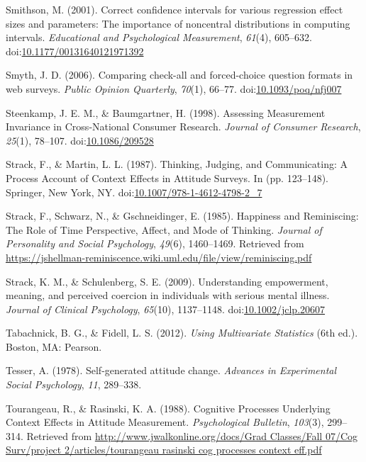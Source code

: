 \documentclass[english,man, mask]{apa6}
\theoremstyle{definition}
\theoremstyle{definition}
\theoremstyle{definition}
\theoremstyle{remark}
\begin{document}
\hypertarget{ref-Smithson2001}{}
Smithson, M. (2001). Correct confidence intervals for various regression
effect sizes and parameters: The importance of noncentral distributions
in computing intervals. \emph{Educational and Psychological
Measurement}, \emph{61}(4), 605--632.
doi:\href{https://doi.org/10.1177/00131640121971392}{10.1177/00131640121971392}

\hypertarget{ref-Smyth2006}{}
Smyth, J. D. (2006). Comparing check-all and forced-choice question
formats in web surveys. \emph{Public Opinion Quarterly}, \emph{70}(1),
66--77.
doi:\href{https://doi.org/10.1093/poq/nfj007}{10.1093/poq/nfj007}

\hypertarget{ref-Steenkamp1998}{}
Steenkamp, J. E. M., \& Baumgartner, H. (1998). Assessing Measurement
Invariance in Cross‐National Consumer Research. \emph{Journal of
Consumer Research}, \emph{25}(1), 78--107.
doi:\href{https://doi.org/10.1086/209528}{10.1086/209528}

\hypertarget{ref-Strack1987}{}
Strack, F., \& Martin, L. L. (1987). Thinking, Judging, and
Communicating: A Process Account of Context Effects in Attitude Surveys.
In (pp. 123--148). Springer, New York, NY.
doi:\href{https://doi.org/10.1007/978-1-4612-4798-2_7}{10.1007/978-1-4612-4798-2\_7}

\hypertarget{ref-Strack1985}{}
Strack, F., Schwarz, N., \& Gschneidinger, E. (1985). Happiness and
Reminiscing: The Role of Time Perspective, Affect, and Mode of Thinking.
\emph{Journal of Personality and Social Psychology}, \emph{49}(6),
1460--1469. Retrieved from
\url{https://jshellman-reminiscence.wiki.uml.edu/file/view/reminiscing.pdf}

\hypertarget{ref-Strack2009}{}
Strack, K. M., \& Schulenberg, S. E. (2009). Understanding empowerment,
meaning, and perceived coercion in individuals with serious mental
illness. \emph{Journal of Clinical Psychology}, \emph{65}(10),
1137--1148.
doi:\href{https://doi.org/10.1002/jclp.20607}{10.1002/jclp.20607}

\hypertarget{ref-Tabachnick2012}{}
Tabachnick, B. G., \& Fidell, L. S. (2012). \emph{Using Multivariate
Statistics} (6th ed.). Boston, MA: Pearson.

\hypertarget{ref-Tesser1978}{}
Tesser, A. (1978). Self-generated attitude change. \emph{Advances in
Experimental Social Psychology}, \emph{11}, 289--338.

\hypertarget{ref-Tourangeau1988}{}
Tourangeau, R., \& Rasinski, K. A. (1988). Cognitive Processes
Underlying Context Effects in Attitude Measurement. \emph{Psychological
Bulletin}, \emph{103}(3), 299--314. Retrieved from
\href{http://www.jwalkonline.org/docs/Grad\%20Classes/Fall\%2007/Cog\%20Surv/project\%202/articles/tourangeau\%20rasinski\%20cog\%20processes\%20context\%20eff.pdf}{http://www.jwalkonline.org/docs/Grad Classes/Fall 07/Cog Surv/project 2/articles/tourangeau rasinski cog processes context eff.pdf}
\end{document}
